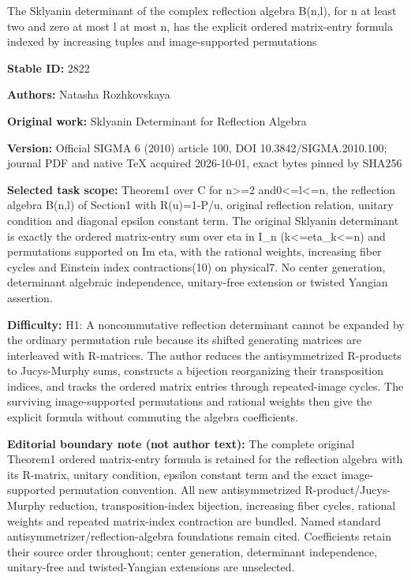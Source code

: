 \documentclass[11pt]{article}
\begin{document}
\begin{center}\Large The Sklyanin determinant of the complex reflection algebra B(n,l), for n at least two and zero at most l at most n, has the explicit ordered matrix-entry formula indexed by increasing tuples and image-supported permutations\end{center}
\noindent\textbf{Stable ID:} 2822\par
\noindent\textbf{Authors:} Natasha Rozhkovskaya\par
\noindent\textbf{Original work:} Sklyanin Determinant for Reflection Algebra\par
\noindent\textbf{Version:} Official SIGMA 6 (2010) article 100, DOI 10.3842/SIGMA.2010.100; journal PDF and native TeX acquired 2026-10-01, exact bytes pinned by SHA256\par
\noindent\textbf{Selected task scope:} Theorem1 over C for n>=\allowbreak{}2 and0<=\allowbreak{}l<=\allowbreak{}n, the reflection algebra B(n,l) of Section1 with R(u)=\allowbreak{}1-P/u, original reflection relation, unitary condition and diagonal epsilon constant term. The original Sklyanin determinant is exactly the ordered matrix-entry sum over eta in I\_n (k<=\allowbreak{}eta\_k<=\allowbreak{}n) and permutations supported on Im eta, with the rational weights, increasing fiber cycles and Einstein index contractions(10) on physical7. No center generation, determinant algebraic independence, unitary-free extension or twisted Yangian assertion.\par
\noindent\textbf{Difficulty:} H1: A noncommutative reflection determinant cannot be expanded by the ordinary permutation rule because its shifted generating matrices are interleaved with R-matrices. The author reduces the antisymmetrized R-products to Jucys-Murphy sums, constructs a bijection reorganizing their transposition indices, and tracks the ordered matrix entries through repeated-image cycles. The surviving image-supported permutations and rational weights then give the explicit formula without commuting the algebra coefficients.\par
\noindent\textbf{Editorial boundary note (not author text):} The complete original Theorem1 ordered matrix-entry formula is retained for the reflection algebra with its R-matrix, unitary condition, epsilon constant term and the exact image-supported permutation convention. All new antisymmetrized R-product/Jucys-Murphy reduction, transposition-index bijection, increasing fiber cycles, rational weights and repeated matrix-index contraction are bundled. Named standard antisymmetrizer/reflection-algebra foundations remain cited. Coefficients retain their source order throughout; center generation, determinant independence, unitary-free and twisted-Yangian extensions are unselected.\par
\end{document}
